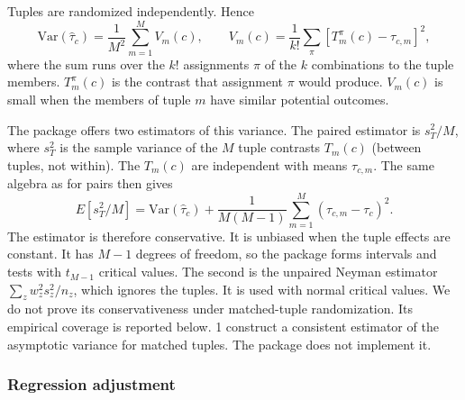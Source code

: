\documentclass[
  11pt,
]{article}
\begin{document}
Tuples are randomized independently. Hence
\begin{equation}
  \text{Var}(\hat{\tau}_c) = \frac{1}{M^2}
    \sum_{m=1}^{M} V_m(c), \qquad
  V_m(c) = \frac{1}{k!} \sum_{\pi}
    \left[ T_m^{\pi}(c) - \tau_{c,m} \right]^2 ,
\end{equation}
where the sum runs over the \(k!\) assignments \(\pi\) of the
\(k\) combinations to the tuple members. \(T_m^{\pi}(c)\) is the
contrast that assignment \(\pi\) would produce. \(V_m(c)\) is
small when the members of tuple \(m\) have similar potential
outcomes.

The package offers two estimators of this variance. The
paired estimator is \(s_T^2/M\), where \(s_T^2\) is the sample
variance of the \(M\) tuple contrasts \(T_m(c)\) (between
tuples, not within). The \(T_m(c)\) are independent with
means \(\tau_{c,m}\). The same algebra as for pairs then gives
\begin{equation}
  E\left[ s_T^2 / M \right] = \text{Var}(\hat{\tau}_c) +
    \frac{1}{M(M-1)} \sum_{m=1}^{M}
    (\tau_{c,m} - \tau_c)^2 .
\end{equation}
The estimator is therefore conservative. It is unbiased
when the tuple effects are constant. It has \(M - 1\) degrees
of freedom, so the package forms intervals and tests with
\(t_{M-1}\) critical values. The second is the unpaired
Neyman estimator \(\sum_z w_z^2 s_z^2 / n_z\), which ignores
the tuples. It is used with normal critical values. We do
not prove its conservativeness under matched-tuple
randomization. Its empirical coverage is reported below.
1 construct a consistent estimator of
the asymptotic variance for matched tuples. The package
does not implement it.

\subsubsection{Regression adjustment}\label{regression-adjustment}
\end{document}
